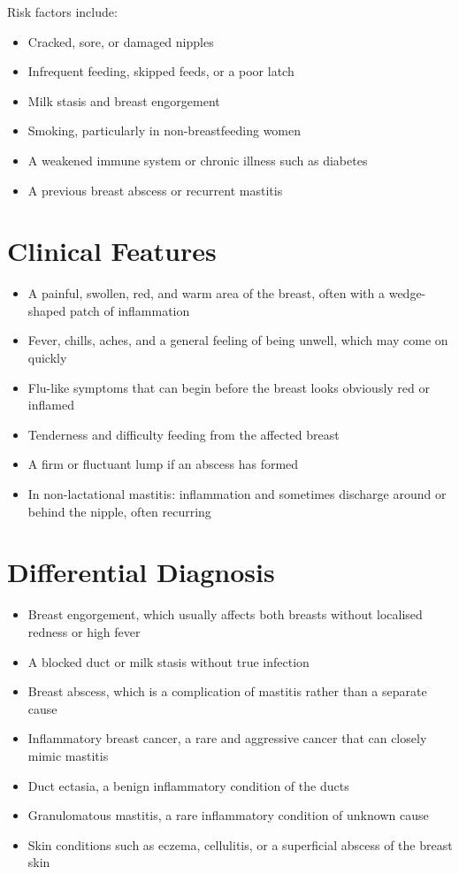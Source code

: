 Risk factors include:

\begin{itemize}
    \item Cracked, sore, or damaged nipples
    \item Infrequent feeding, skipped feeds, or a poor latch
    \item Milk stasis and breast engorgement
    \item Smoking, particularly in non-breastfeeding women
    \item A weakened immune system or chronic illness such as diabetes
    \item A previous breast abscess or recurrent mastitis
\end{itemize}

\section*{Clinical Features}
\begin{itemize}
    \item A painful, swollen, red, and warm area of the breast, often with a wedge-shaped patch of inflammation
    \item Fever, chills, aches, and a general feeling of being unwell, which may come on quickly
    \item Flu-like symptoms that can begin before the breast looks obviously red or inflamed
    \item Tenderness and difficulty feeding from the affected breast
    \item A firm or fluctuant lump if an abscess has formed
    \item In non-lactational mastitis: inflammation and sometimes discharge around or behind the nipple, often recurring
\end{itemize}

\section*{Differential Diagnosis}
\begin{itemize}
    \item Breast engorgement, which usually affects both breasts without localised redness or high fever
    \item A blocked duct or milk stasis without true infection
    \item Breast abscess, which is a complication of mastitis rather than a separate cause
    \item Inflammatory breast cancer, a rare and aggressive cancer that can closely mimic mastitis
    \item Duct ectasia, a benign inflammatory condition of the ducts
    \item Granulomatous mastitis, a rare inflammatory condition of unknown cause
    \item Skin conditions such as eczema, cellulitis, or a superficial abscess of the breast skin
\end{itemize}

